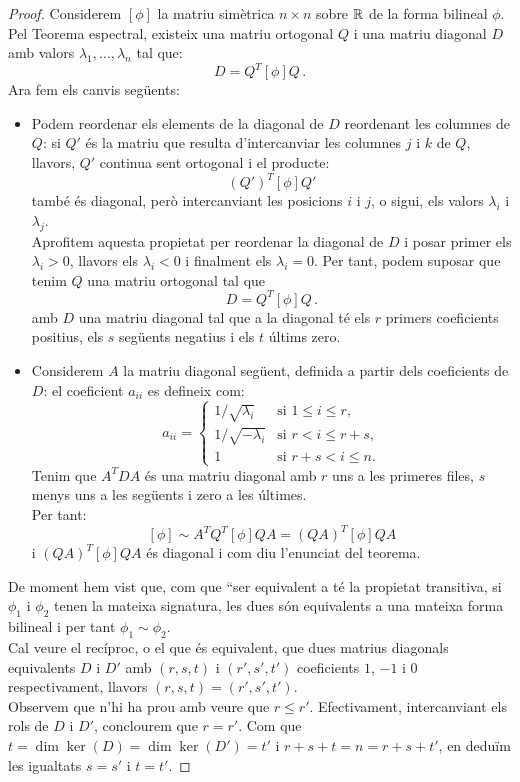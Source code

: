 \documentclass[
  11pt,
]{book}
\numberwithin{dummy}{section}
\theoremstyle{maincolornumbox}
\theoremstyle{blacknumex}
\theoremstyle{blacknumbox}
\theoremstyle{maincolornum}
\newlength\esp
\begin{document}
\begin{proof}
Considerem \([\phi]\) la matriu simètrica \(n\times n\) sobre \(\mathbb{R}\)
de la forma bilineal \(\phi\). Pel Teorema espectral, existeix una matriu
ortogonal \(Q\) i una matriu diagonal \(D\) amb valors
\(\lambda_1, \dots, \lambda_n\) tal que: \[D=Q^T [\phi] Q \,.\] Ara fem
els canvis següents:

\begin{itemize}
\item
  Podem reordenar els elements de la diagonal de \(D\) reordenant les
  columnes de \(Q\): si \(Q'\) és la matriu que resulta d'intercanviar les
  columnes \(j\) i \(k\) de \(Q\), llavors, \(Q'\) continua sent ortogonal i
  el producte: \[(Q')^T[\phi]Q'\] també és diagonal, però
  intercanviant les posicions \(i\) i \(j\), o sigui, els valors
  \(\lambda_i\) i \(\lambda_j\).\\
  Aprofitem aquesta propietat per reordenar la diagonal de \(D\) i posar
  primer els \(\lambda_i>0\), llavors els \(\lambda_i<0\) i finalment els
  \(\lambda_i=0\). Per tant, podem suposar que tenim \(Q\) una matriu
  ortogonal tal que \[D=Q^T [\phi] Q \,.\] amb \(D\) una matriu diagonal
  tal que a la diagonal té els \(r\) primers coeficients positius, els
  \(s\) següents negatius i els \(t\) últims zero.
\item
  Considerem \(A\) la matriu diagonal següent, definida a partir dels
  coeficients de \(D\): el coeficient \(a_{ii}\) es defineix com:
  \[a_{ii}=\begin{cases}
      1/\sqrt{\lambda_i} & \text{si $1\leq i \leq r$,} \\
      1/\sqrt{-\lambda_i} & \text{si $r < i \leq r+s$,} \\
      1 & \text{si $r+s < i \leq n$.}
      \end{cases}\] Tenim que \(A^TDA\) és una matriu diagonal amb \(r\)
  uns a les primeres files, \(s\) menys uns a les següents i zero a les
  últimes.\\
  Per tant: \[[\phi] \sim A^TQ^T [\phi] QA = (QA)^T [\phi] QA\] i
  \((QA)^T [\phi] QA\) és diagonal i com diu l'enunciat del teorema.
\end{itemize}

De moment hem vist que, com que ``ser equivalent a té la propietat
transitiva, si \(\phi_1\) i \(\phi_2\) tenen la mateixa signatura, les dues
són equivalents a una mateixa forma bilineal i per tant
\(\phi_1\sim \phi_2\).\\
Cal veure el recíproc, o el que és equivalent, que dues matrius
diagonals equivalents \(D\) i \(D'\) amb \((r,s,t)\) i \((r',s',t')\)
coeficients \(1\), \(-1\) i \(0\) respectivament, llavors
\((r,s,t)=(r',s',t')\).\\
Observem que n'hi ha prou amb veure que \(r\leq r'\). Efectivament,
intercanviant els rols de \(D\) i \(D'\), conclourem que \(r=r'\). Com que
\(t=\dim\ker(D)=\dim\ker(D')=t'\) i \(r+s+t=n=r+s+t'\), en deduïm les
igualtats \(s=s'\) i \(t=t'\).


\end{proof}
\end{document}
